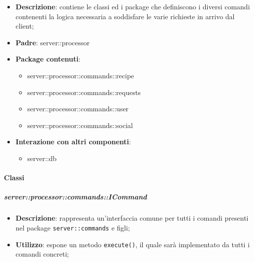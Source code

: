     \begin{itemize}
      \item \textbf{Descrizione}: contiene le classi ed i package che definiscono i diversi comandi contenenti la logica necessaria a soddisfare le varie richieste in arrivo dal client;
      \item \textbf{Padre}: server::processor
      \item \textbf{Package contenuti}:
        \begin{itemize}
          \item server::processor::commands::recipe
          \item server::processor::commands::requests
          \item server::processor::commands::user
          \item server::processor::commands::social
        \end{itemize}
      \item \textbf{Interazione con altri componenti}:
        \begin{itemize}
          \item server::db
        \end{itemize}
    \end{itemize}

      \paragraph{Classi} %

      \subparagraph{server::processor::commands::ICommand} %
      \label{subp:bdsm_app_server_processor_commands_icommand}
      \begin{itemize}
        \item \textbf{Descrizione}: rappresenta un'interfaccia comune per tutti i comandi presenti nel package \texttt{server::commands} e figli;
        \item \textbf{Utilizzo}: espone un metodo \texttt{execute()}, il quale sarà implementato da tutti i comandi concreti;
      \end{itemize}


